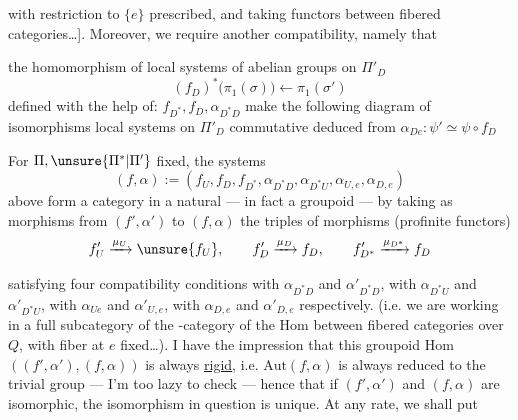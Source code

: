 with restriction to $\{e\}$ prescribed, and taking
 functors between fibered categories\ldots].
Moreover, we require another compatibility, namely that


 the homomorphism of local systems of abelian groups on $\Pi'_D$
\[
(f_D)^*\bigl(\pi_1(\sigma)\bigr)
\longleftarrow \pi_1(\sigma')
\]
defined with the help of: $f_{D^*},f_D,\alpha_{D^*D}$
make the following diagram
of isomorphisms 
 local systems on $\Pi'_D$ commutative
deduced from $\alpha_{De}:\psi'\simeq\psi\circ f_D$


For $\Pi,\unsure{\Pi^*|\Pi'}$ fixed, the systems
\[
(f,\alpha):=(f_U,f_D,f_{D^*},\alpha_{D^*D},\alpha_{D^*U},
\alpha_{U,e},\alpha_{D,e})
\]
above form a category in a natural 
--- in fact a groupoid --- by taking as morphisms
\inserted{$\mu$} from $(f',\alpha')$ to $(f,\alpha)$
the triples of morphisms
(profinite functors)
\[
f'_U\xrightarrow{\mu_U}\unsure{f_U},\qquad
f'_D\xrightarrow{\mu_D}f_D,\qquad
f'_{D^*}\xrightarrow{\mu_{D^*}}f_D
\]


satisfying  four compatibility conditions with
$\alpha_{D^*D}$ and $\alpha'_{D^*D}$, with $\alpha_{D^*U}$ and
$\alpha'_{D^*U}$, with $\alpha_{Ue}$ and $\alpha'_{U,e}$, with
$\alpha_{D,e}$ and $\alpha'_{D,e}$ respectively.
(i.e. we are working in a full subcategory of the
-category of the \uline{$\mathrm{Hom}$} between fibered
categories over $Q$, with fiber at $e$ fixed\ldots).
I have the impression that this groupoid
\uline{$\mathrm{Hom}$}$((f',\alpha'),(f,\alpha))$ is
always \uline{rigid}, i.e.
$\mathrm{Aut}(f,\alpha)$ is always reduced to the trivial group
--- I'm too lazy to check --- hence that if $(f',\alpha')$ and
$(f,\alpha)$ are isomorphic, the isomorphism in question is unique.
At any rate, we shall put

